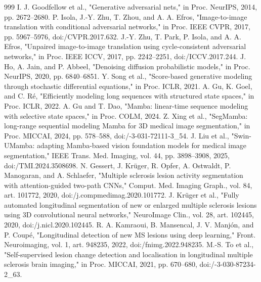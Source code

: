 \documentclass[journal,twoside,web]{ieeecolor}
\begin{document}
\begin{thebibliography}{999}
 I. J. Goodfellow et al., "Generative adversarial nets," in Proc. NeurIPS, 2014, pp. 2672--2680.
 P. Isola, J.-Y. Zhu, T. Zhou, and A. A. Efros, "Image-to-image translation with conditional adversarial networks," in Proc. IEEE CVPR, 2017, pp. 5967--5976, doi:/\allowbreak CVPR.2017.632.
 J.-Y. Zhu, T. Park, P. Isola, and A. A. Efros, "Unpaired image-to-image translation using cycle-consistent adversarial networks," in Proc. IEEE ICCV, 2017, pp. 2242--2251, doi:/\allowbreak ICCV.2017.244.
 J. Ho, A. Jain, and P. Abbeel, "Denoising diffusion probabilistic models," in Proc. NeurIPS, 2020, pp. 6840--6851.
 Y. Song et al., "Score-based generative modeling through stochastic differential equations," in Proc. ICLR, 2021.
 A. Gu, K. Goel, and C. Ré, "Efficiently modeling long sequences with structured state spaces," in Proc. ICLR, 2022.
 A. Gu and T. Dao, "Mamba: linear-time sequence modeling with selective state spaces," in Proc. COLM, 2024.
 Z. Xing et al., "SegMamba: long-range sequential modeling Mamba for 3D medical image segmentation," in Proc. MICCAI, 2024, pp. 578--588, doi:/-3-031-72111-3\_54.
 J. Liu et al., "Swin-UMamba: adapting Mamba-based vision foundation models for medical image segmentation," IEEE Trans. Med. Imaging, vol. 44, pp. 3898--3908, 2025, doi:/\allowbreak TMI.2024.3508698.
 N. Gessert, J. Krüger, R. Opfer, A. Ostwaldt, P. Manogaran, and A. Schlaefer, "Multiple sclerosis lesion activity segmentation with attention-guided two-path CNNs," Comput. Med. Imaging Graph., vol. 84, art. 101772, 2020, doi:/\allowbreak j.compmedimag.2020.101772.
 J. Krüger et al., "Fully automated longitudinal segmentation of new or enlarged multiple sclerosis lesions using 3D convolutional neural networks," NeuroImage Clin., vol. 28, art. 102445, 2020, doi:/\allowbreak j.nicl.2020.102445.
 R. A. Kamraoui, B. Mansencal, J. V. Manjón, and P. Coupé, "Longitudinal detection of new MS lesions using deep learning," Front. Neuroimaging, vol. 1, art. 948235, 2022, doi:/\allowbreak fnimg.2022.948235.
 M.-S. To et al., "Self-supervised lesion change detection and localisation in longitudinal multiple sclerosis brain imaging," in Proc. MICCAI, 2021, pp. 670--680, doi:/-3-030-87234-2\_63.

\end{thebibliography}
\end{document}
